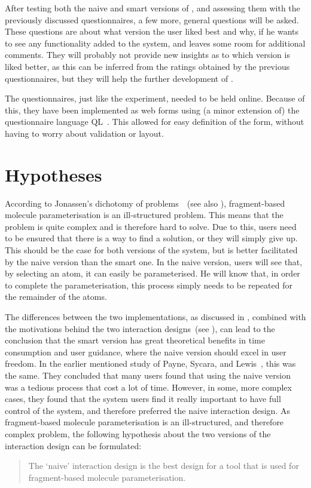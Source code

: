 After testing both the naive and smart versions of \oframp, and assessing them with the previously discussed questionnaires, a few more, general questions will be asked. These questions are about what version the user liked best and why, if he wants to see any functionality added to the system, and leaves some room for additional comments. They will probably not provide new insights as to which version is liked better, as this can be inferred from the ratings obtained by the previous questionnaires, but they will help the further development of \oframp.

The questionnaires, just like the experiment, needed to be held online. Because of this, they have been implemented as web forms using (a minor extension of) the questionnaire language QL~\cite{erdweg2013state}. This allowed for easy definition of the form, without having to worry about validation or layout.



\section{Hypotheses}
According to Jonassen's dichotomy of problems~\cite{jonassen2000toward}~(see also ), fragment-based molecule parameterisation is an ill-structured problem. This means that the problem is quite complex and is therefore hard to solve. Due to this, users need to be ensured that there is a way to find a solution, or they will simply give up. This should be the case for both versions of the system, but is better facilitated by the naive version than the smart one. In the naive version, users will see that, by selecting an atom, it can easily be parameterised. He will know that, in order to complete the parameterisation, this process simply needs to be repeated for the remainder of the atoms.

The differences between the two implementations, as discussed in , combined with the motivations behind the two interaction designs~(see ), can lead to the conclusion that the smart version has great theoretical benefits in time consumption and user guidance, where the naive version should excel in user freedom. In the earlier mentioned study of Payne, Sycara, and Lewis~\cite{payne2000varying}, this was the same. They concluded that many users found that using the naive version was a tedious process that cost a lot of time. However, in some, more complex cases, they found that the system users find it really important to have full control of the system, and therefore preferred the naive interaction design. As fragment-based molecule parameterisation is an ill-structured, and therefore complex problem, the following hypothesis about the two versions of the interaction design can be formulated:
\begin{quote}
The `naive' interaction design is the best design for a tool that is used for fragment-based molecule parameterisation.
\end{quote}

